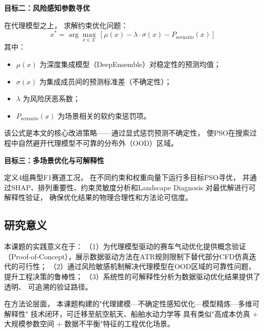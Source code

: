 \noindent
\textbf{目标二：风险感知参数寻优}

在代理模型之上，
求解约束优化问题：
\begin{equation}
    x^* = \arg\max_{x \in \mathcal{X}} \,
    \left[ \mu(x) - \lambda \cdot \sigma(x) - P_{\text{scenario}}(x) \right]
    \label{eq:obj}
\end{equation}
其中：
\begin{itemize}
    \item $\mu(x)$ 为深度集成模型（DeepEnsemble）对稳定性的预测均值；
    \item $\sigma(x)$ 为集成成员间的预测标准差（不确定性）；
    \item $\lambda$ 为风险厌恶系数；
    \item $P_{\text{scenario}}(x)$ 为场景相关的软约束惩罚项。
\end{itemize}

该公式是本文的核心改进策略——通过显式惩罚预测不确定性，
使PSO在搜索过程中自然避开代理模型不可靠的分布外（OOD）区域。

\vspace{0.3cm}

\noindent
\textbf{目标三：多场景优化与可解释性}

定义4组典型F1赛道工况，
在不同约束和权重向量下运行多目标PSO寻优，
并通过SHAP、排列重要性、约束灵敏度分析和Landscape Diagnosis
对最优解进行可解释性验证，
确保优化结果的物理合理性和方法论可信度。

\subsection{研究意义}

本课题的实践意义在于：
（1）为代理模型驱动的赛车气动优化提供概念验证（Proof-of-Concept），展示数据驱动方法在ATR规则限制下替代部分CFD仿真迭代的可行性；
（2）通过风险敏感机制解决代理模型在OOD区域的可靠性问题，
提升工程决策的鲁棒性；
（3）系统性的可解释性分析为数据驱动优化结果提供了透明、
可追溯的验证路径。

在方法论层面，
本课题构建的"代理建模—不确定性感知优化—模型精炼—多维可解释性"
技术闭环，可迁移至航空航天、船舶水动力学等
具有类似"高成本仿真 + 大规模参数空间 + 数据不平衡"特征的工程优化场景。
